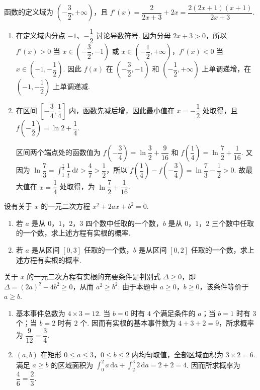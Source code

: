 \begin{solution}
函数的定义域为 \(\left(-\dfrac{3}{2},+\infty\right)\)，且
\(f'(x)=\dfrac{2}{2x+3}+2x=\dfrac{2(2x+1)(x+1)}{2x+3}\).

\begin{enumerate}
\item 在定义域内分点 \(-1\)、\(-\dfrac{1}{2}\) 讨论导数符号. 因为分母 \(2x+3>0\)，所以 \(f'(x)>0\) 当 \(x\in\left(-\dfrac{3}{2},-1\right)\) 或 \(x\in\left(-\dfrac{1}{2},+\infty\right)\)，\(f'(x)<0\) 当 \(x\in\left(-1,-\dfrac{1}{2}\right)\). 因此 \(f(x)\) 在 \(\left(-\dfrac{3}{2},-1\right)\) 和 \(\left(-\dfrac{1}{2},+\infty\right)\) 上单调递增，在 \(\left(-1,-\dfrac{1}{2}\right)\) 上单调递减.
\item 在区间 \(\left[-\dfrac{3}{4},\dfrac{1}{4}\right]\) 内，函数先减后增，因此最小值在 \(x=-\dfrac{1}{2}\) 处取得，且
\(f\left(-\dfrac{1}{2}\right)=\ln2+\dfrac{1}{4}\).

区间两个端点处的函数值为 \(f\left(-\dfrac{3}{4}\right)=\ln\dfrac{3}{2}+\dfrac{9}{16}\) 和 \(f\left(\dfrac{1}{4}\right)=\ln\dfrac{7}{2}+\dfrac{1}{16}\). 又因为
\(\ln\dfrac{7}{3}=\displaystyle\int_{1}^{\frac{7}{3}}\dfrac{1}{t}\,\mathrm{d}t>\dfrac{4}{7}>\dfrac{1}{2}\)，所以 \(f\left(\dfrac{1}{4}\right)-f\left(-\dfrac{3}{4}\right)=\ln\dfrac{7}{3}-\dfrac{1}{2}>0\). 故最大值在 \(x=\dfrac{1}{4}\) 处取得，为 \(\ln\dfrac{7}{2}+\dfrac{1}{16}\).
\end{enumerate}
\end{solution}

\begin{problem}
设有关于 \(x\) 的一元二次方程 \(x^{2} + 2ax + b^{2} = 0\).
\begin{enumerate}
\item 若 \(a\) 是从 \(0\)，\(1\)，\(2\)，\(3\) 四个数中任取的一个数，\(b\) 是从 \(0\)，\(1\)，\(2\) 三个数中任取的一个数，求上述方程有实根的概率.
\item 若 \(a\) 是从区间 \([0,3]\) 任取的一个数，\(b\) 是从区间 \([0,2]\) 任取的一个数，求上述方程有实根的概率.
\end{enumerate}
\end{problem}

\begin{solution}
关于 \(x\) 的一元二次方程有实根的充要条件是判别式 \(\Delta\geqslant0\)，即
\(\Delta=(2a)^{2}-4b^{2}\geqslant0\)，从而 \(a^{2}\geqslant b^{2}\). 由于本题中 \(a\geqslant0\)，\(b\geqslant0\)，该条件等价于 \(a\geqslant b\).

\begin{enumerate}
\item 基本事件总数为 \(4\times3=12\). 当 \(b=0\) 时有 \(4\) 个满足条件的 \(a\)；当 \(b=1\) 时有 \(3\) 个；当 \(b=2\) 时有 \(2\) 个. 因而有实根的基本事件数为 \(4+3+2=9\)，所求概率为 \(\dfrac{9}{12}=\dfrac{3}{4}\).
\item \((a,b)\) 在矩形 \(0\leqslant a\leqslant3\)，\(0\leqslant b\leqslant2\) 内均匀取值，全部区域面积为 \(3\times2=6\). 满足 \(a\geqslant b\) 的区域面积为
\(\displaystyle\int_{0}^{2}a\,\mathrm{d}a+\int_{2}^{3}2\,\mathrm{d}a=2+2=4\). 因而所求概率为 \(\dfrac{4}{6}=\dfrac{2}{3}\).
\end{enumerate}
\end{solution}

